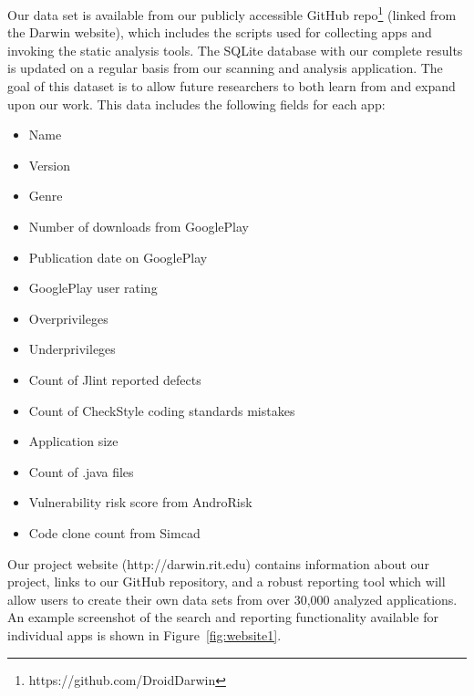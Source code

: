 \documentclass[conference]{IEEEtran}
\begin{document}
Our data set is available from our publicly accessible GitHub repo\footnote{https://github.com/DroidDarwin} (linked from the Darwin website), which includes the scripts used for collecting apps and invoking the static analysis tools. The SQLite database with our complete results is updated on a regular basis from our scanning and analysis application. The goal of this dataset is to allow future researchers to both learn from and expand upon our work. This data includes the following fields for each app:

\begin{itemize}
  \item Name
  \item Version
  \item Genre
   \item Number of downloads from GooglePlay
  \item Publication date on GooglePlay
  \item GooglePlay user rating
  \item Overprivileges
  \item Underprivileges
  \item Count of Jlint reported defects
  \item Count of CheckStyle coding standards mistakes
  \item Application size
  \item Count of .java files
  \item Vulnerability risk score from AndroRisk
  \item Code clone count from Simcad
\end{itemize}

Our project website (http://darwin.rit.edu) contains information about our project, links to our GitHub repository, and a robust reporting tool which will allow users to create their own data sets from over 30,000 analyzed applications. An example screenshot of the search and reporting functionality available for individual apps is shown in Figure~\ref{fig:website1}.
\end{document}
